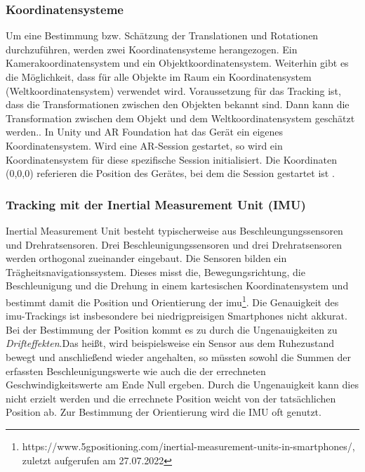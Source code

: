 \subsubsection{Koordinatensysteme}
\label{tracking-koordinatensysteme}
Um eine Bestimmung bzw. Schätzung der Translationen und Rotationen durchzuführen, werden zwei Koordinatensysteme herangezogen. Ein Kamerakoordinatensystem und ein Objektkoordinatensystem. Weiterhin gibt es die Möglichkeit, dass für alle Objekte im Raum ein Koordinatensystem (Weltkoordinatensystem) verwendet wird. Voraussetzung für das Tracking ist, dass die Transformationen zwischen den Objekten bekannt sind. Dann kann die Transformation zwischen dem Objekt und dem Weltkoordinatensystem geschätzt werden.\cite*[Dörner (2019) S.124f.]{doerner}.
In Unity und AR Foundation hat das Gerät ein eigenes Koordinatensystem. Wird eine AR-Session gestartet, so wird ein Koordinatensystem für diese spezifische Session initialisiert. Die Koordinaten (0,0,0) referieren die Position des Gerätes, bei dem die Session gestartet ist \cite{UnityARFoundation}.

\subsubsection{Tracking mit der Inertial Measurement Unit (IMU)}
Inertial Measurement Unit besteht typischerweise aus Beschleungungssensoren und Drehratsensoren. Drei Beschleunigungssensoren und drei Drehratsensoren werden orthogonal zueinander eingebaut. Die Sensoren bilden ein Trägheitsnavigationssystem. Dieses misst die, Bewegungsrichtung, die Beschleunigung und die Drehung in einem kartesischen Koordinatensystem und bestimmt damit die Position und Orientierung der \acrshort{imu}\footnote{https://www.5gpositioning.com/inertial-measurement-units-in-smartphones/, zuletzt aufgerufen am 27.07.2022}.
Die Genauigkeit des \acrshort{imu}-Trackings ist insbesondere bei niedrigpreisigen Smartphones nicht akkurat. Bei der Bestimmung der Position kommt es zu durch die Ungenauigkeiten zu \textit{Drifteffekten}.\glqq Das heißt, wird beispielsweise ein Sensor aus dem Ruhezustand bewegt und anschließend wieder angehalten, so müssten sowohl die Summen der erfassten Beschleunigungswerte wie auch die der errechneten Geschwindigkeitswerte am Ende Null ergeben\grqq{}\cite*[Dörner (2019) S.127f.]{doerner}. Durch die Ungenauigkeit kann dies nicht erzielt werden und die errechnete Position weicht von der tatsächlichen Position ab. Zur Bestimmung der Orientierung wird die IMU oft genutzt.

